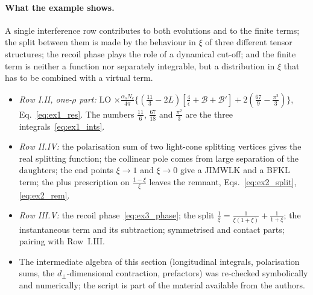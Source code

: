 \paragraph{What the example shows.} A single interference row contributes to both evolutions and to the finite terms; the split between them is made by the behaviour in $\xi$ of three different tensor structures; the recoil phase plays the role of a dynamical cut-off; and the finite term is neither a function nor separately integrable, but a distribution in $\xi$ that has to be combined with a virtual term.

\begin{summarybox}
\begin{itemize}
\item \emph{Row I.II, one-$\rho$ part:} LO $\times\frac{\alpha_sN_c}{4\pi}\{(\frac{11}{3}-2L)[\frac4\epsilon+\mathcal B+\mathcal B']+2(\frac{67}{9}-\frac{\pi^2}{3})\}$, Eq.~\eqref{eq:ex1_res}. The numbers $\frac{11}{6}$, $\frac{67}{18}$ and $\frac{\pi^2}{3}$ are the three integrals~\eqref{eq:ex1_ints}.
\item \emph{Row II.IV:} the polarisation sum of two light-cone splitting vertices gives the real splitting function; the collinear pole comes from large separation of the daughters; the end points $\xi\to1$ and $\xi\to0$ give a JIMWLK and a BFKL term; the plus prescription on $\frac{1-\xi}{\xi}$ leaves the remnant, Eqs.~\eqref{eq:ex2_split}, \eqref{eq:ex2_rem}.
\item \emph{Row III.V:} the recoil phase~\eqref{eq:ex3_phase}; the split $\frac1\xi=\frac{1}{\xi(1+\xi)}+\frac{1}{1+\xi}$; the instantaneous term and its subtraction; symmetrised and contact parts; pairing with Row~I.III.
\item The intermediate algebra of this section (longitudinal integrals, polarisation sums, the $d_\perp$-dimensional contraction, prefactors) was re-checked symbolically and numerically; the script is part of the material available from the authors.
\end{itemize}
\end{summarybox}
